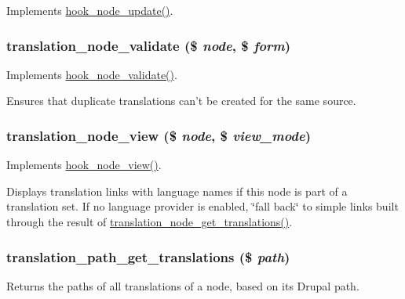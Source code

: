 \label{translation_8module_a37a29aeaa942629df85189e8ce71c6ec}
Implements \hyperlink{group__node__api__hooks_gac66c767cc922fcbfdaf17252e5d87d9d}{hook\_\-node\_\-update()}. \hypertarget{translation_8module_a91f395bd462e1dcf90a1def42948f5f4}{
\subsubsection[{translation\_\-node\_\-validate}]{\setlength{\rightskip}{0pt plus 5cm}translation\_\-node\_\-validate (\$ {\em node}, \/  \$ {\em form})}}
\label{translation_8module_a91f395bd462e1dcf90a1def42948f5f4}
Implements \hyperlink{group__node__api__hooks_gad26227eaf0dd513134767a11be40ab1d}{hook\_\-node\_\-validate()}.

Ensures that duplicate translations can't be created for the same source. \hypertarget{translation_8module_ad5700a0fbf2cbcc954aa8a6a01ffb4d3}{
\subsubsection[{translation\_\-node\_\-view}]{\setlength{\rightskip}{0pt plus 5cm}translation\_\-node\_\-view (\$ {\em node}, \/  \$ {\em view\_\-mode})}}
\label{translation_8module_ad5700a0fbf2cbcc954aa8a6a01ffb4d3}
Implements \hyperlink{group__node__api__hooks_ga475290ee8e81a2373ea17c512cc3f9a9}{hook\_\-node\_\-view()}.

Displays translation links with language names if this node is part of a translation set. If no language provider is enabled, \char`\"{}fall back\char`\"{} to simple links built through the result of \hyperlink{translation_8module_a9cd21a77e9349062baa9a7c861797204}{translation\_\-node\_\-get\_\-translations()}. \hypertarget{translation_8module_a383176f0527c7acf255135ff564bf642}{
\subsubsection[{translation\_\-path\_\-get\_\-translations}]{\setlength{\rightskip}{0pt plus 5cm}translation\_\-path\_\-get\_\-translations (\$ {\em path})}}
\label{translation_8module_a383176f0527c7acf255135ff564bf642}
Returns the paths of all translations of a node, based on its Drupal path.


